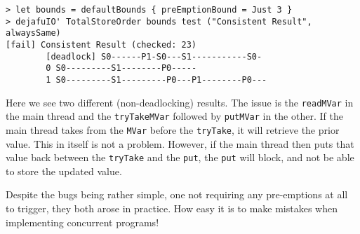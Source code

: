 \begin{verbatim}
> let bounds = defaultBounds { preEmptionBound = Just 3 }
> dejafuIO' TotalStoreOrder bounds test ("Consistent Result", alwaysSame)
[fail] Consistent Result (checked: 23)
        [deadlock] S0------P1-S0---S1-----------S0-
        0 S0---------S1--------P0-----
        1 S0---------S1---------P0---P1--------P0---
\end{verbatim}

Here we see two different (non-deadlocking) results. The issue is the
\verb|readMVar| in the main thread and the \verb|tryTakeMVar| followed
by \verb|putMVar| in the other. If the main thread takes from the
\verb|MVar| before the \verb|tryTake|, it will retrieve the prior
value. This in itself is not a problem. However, if the main thread
then puts that value back between the \verb|tryTake| and the
\verb|put|, the \verb|put| will block, and not be able to store the
updated value.

Despite the bugs being rather simple, one not requiring any
pre-emptions at all to trigger, they both arose in practice. How easy
it is to make mistakes when implementing concurrent programs!
